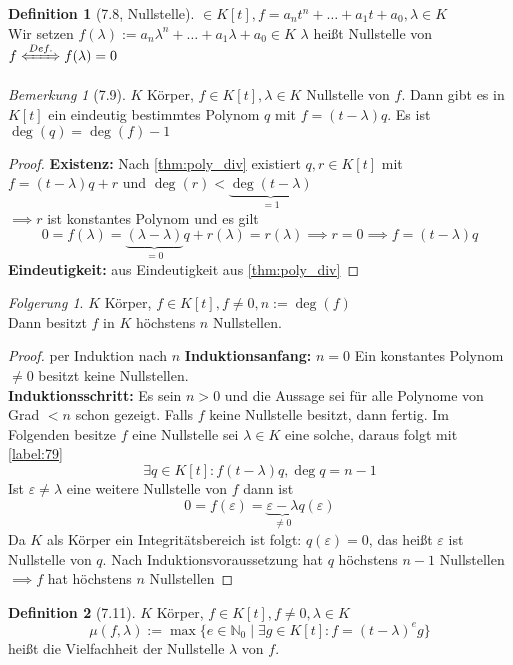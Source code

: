 \documentclass[a4paper]{scrartcl}
\DeclareMathOperator{\Exists}{\exists}
\theoremstyle{definition}
\newtheorem{defn}{Definition}
\theoremstyle{plain}
\theoremstyle{plain}
\theoremstyle{remark}
\newtheorem{remark}{Bemerkung}
\theoremstyle{remark}
\theoremstyle{remark}
\newtheorem{conc}{Folgerung}
\theoremstyle{remark}
\theoremstyle{remark}
\begin{document}
\begin{defn}[7.8, Nullstelle]
$\in K[t], f = a_n t^n + \ldots + a_1 t + a_0, \lambda \in K$ \\
  Wir setzen $f(\lambda) := a_n \lambda^n + \ldots + a_1\lambda + a_0 \in K$
$\lambda$ heißt Nullstelle von $f \xLeftrightarrow{Def.} f(\lambda) = 0$
\end{defn}
\begin{remark}[7.9]
\label{remark:79}
$K$ Körper, $f\in K[t], \lambda \in K$ Nullstelle von $f$. Dann gibt es in $K[t]$ ein eindeutig bestimmtes Polynom $q$ mit $f = (t - \lambda)q$.
Es ist $\deg(q) = \deg(f) - 1$
\end{remark}
\begin{proof}
\textbf{Existenz:} Nach \ref{thm:poly_div} existiert $q,r\in K[t]$ mit $f = (t - \lambda)q + r$ und $\deg(r) < \underbrace{\deg(t - \lambda)}_{= 1}$ \\
  $\implies r$ ist konstantes Polynom und es gilt
\[0 = f(\lambda) = \underbrace{(\lambda - \lambda)}_{= 0} q + r(\lambda) = r(\lambda) \implies r = 0 \implies f = (t - \lambda) q\]
\textbf{Eindeutigkeit:} aus Eindeutigkeit aus \ref{thm:poly_div}
\end{proof}
\begin{conc}
$K$ Körper, $f\in K[t], f\neq 0, n:= \deg(f)$ \\
  Dann besitzt $f$ in $K$ höchstens $n$ Nullstellen.
\end{conc}
\begin{proof}
per Induktion nach $n$
\textbf{Induktionsanfang:} $n = 0$ Ein konstantes Polynom $\neq 0$ besitzt keine Nullstellen. \\
  \textbf{Induktionsschritt:} Es sein $n > 0$ und die Aussage sei für alle Polynome von Grad $< n$ schon gezeigt.
Falls $f$ keine Nullstelle besitzt, dann fertig.
Im Folgenden besitze $f$ eine Nullstelle sei $\lambda \in K$ eine solche, daraus folgt mit \ref{label:79}
\[\exists q\in K[t]: f(t - \lambda)q, \deg{q} = n - 1\]
Ist $\varepsilon \neq \lambda$ eine weitere Nullstelle von $f$ dann ist
\[0 = f(\varepsilon) = \underbrace{\varepsilon - \lambda}_{\neq 0}q(\varepsilon)\]
Da $K$ als Körper ein Integritätsbereich ist folgt: $q(\varepsilon) = 0$, das heißt $\varepsilon$ ist Nullstelle von $q$.
Nach Induktionsvoraussetzung hat $q$ höchstens $n-1$ Nullstellen $\implies f$ hat höchstens $n$ Nullstellen
\end{proof}
\begin{defn}[7.11]
\label{dfn:zero}
$K$ Körper, $f\in K[t], f\neq 0,\lambda \in K$
\[\mu (f,\lambda) := \max\{e\in\mathbb{N}_0 \mid \Exists g\in K[t]: f = (t - \lambda)^e g\}\]
heißt die Vielfachheit der Nullstelle $\lambda$ von $f$.
\end{defn}
\end{document}

